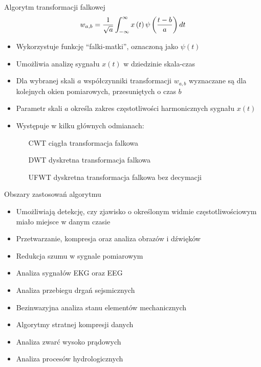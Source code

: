 \documentclass[12pt, polish, aspectratio = 169]{beamer}
\begin{document}

\begin{frame}{Algorytm transformacji falkowej}
\begin{equation}
w_{a,b} = \frac{1}{\sqrt{a}} \int _{-\infty} ^{\infty} x \left(t\right) \psi \left(\frac{t-b}{a}\right) dt \label{eq:cwt}
\end{equation}
\begin{itemize}
\item Wykorzystuje funkcję \enquote{falki-matki}, oznaczoną jako $\psi(t)$
\item Umożliwia analizę sygnału $x(t)$ w dziedzinie skala-czas
\item Dla wybranej skali $a$ współczynniki transformacji $w_{a,b}$ wyznaczane są dla kolejnych okien pomiarowych, przesuniętych o czas $b$
\item Parametr skali $a$ określa zakres częstotliwości harmonicznych sygnału $x(t)$
\item Występuje w kilku głównych odmianach:
	\begin{itemize}
	\item[CWT] ciągła transformacja falkowa
	\item[DWT] dyskretna transformacja falkowa
	\item[UFWT] dyskretna transformacja falkowa bez decymacji
	\end{itemize}
\end{itemize}
\end{frame}

\begin{frame}{Obszary zastosowań algorytmu}
\begin{itemize}
\item Umożliwiają detekcję, czy zjawisko o określonym widmie częstotliwościowym miało miejsce w danym czasie
\end{itemize}
\begin{itemize}
\item Przetwarzanie, kompresja oraz analiza obrazów i dźwięków
\item Redukcja szumu w sygnale pomiarowym
\item Analiza sygnałów EKG oraz EEG
\item Analiza przebiegu drgań sejsmicznych
\item Bezinwazyjna analiza stanu elementów mechanicznych
\item Algorytmy stratnej kompresji danych
\item Analiza zwarć wysoko prądowych
\item Analiza procesów hydrologicznych
\end{itemize}
\end{frame}
\end{document}
